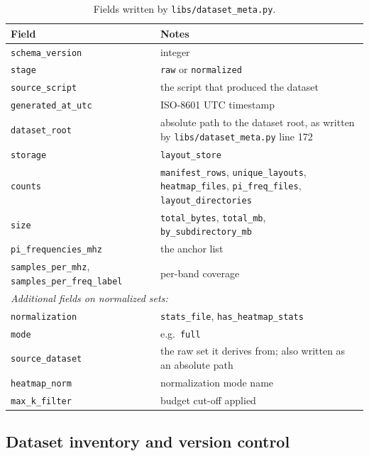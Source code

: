 \begin{table}[htbp]
\centering
\caption{Fields written by \texttt{libs/dataset\_meta.py}.}
\label{tab:appA_meta_fields}
\begin{tabular}{p{} p{}}
\hline
Field & Notes \\
\hline
\texttt{schema\_version} & integer \\
\texttt{stage} & \texttt{raw} or \texttt{normalized} \\
\texttt{source\_script} & the script that produced the dataset \\
\texttt{generated\_at\_utc} & ISO-8601 UTC timestamp \\
\texttt{dataset\_root} & absolute path to the dataset root, as written by
\texttt{libs/dataset\_meta.py} line 172 \\
\texttt{storage} & \texttt{layout\_store} \\
\texttt{counts} & \texttt{manifest\_rows}, \texttt{unique\_layouts}, \texttt{heatmap\_files},
\texttt{pi\_freq\_files}, \texttt{layout\_directories} \\
\texttt{size} & \texttt{total\_bytes}, \texttt{total\_mb}, \texttt{by\_subdirectory\_mb} \\
\texttt{pi\_frequencies\_mhz} & the anchor list \\
\texttt{samples\_per\_mhz}, \texttt{samples\_per\_freq\_label} & per-band coverage \\
\hline
\multicolumn{2}{l}{\emph{Additional fields on normalized sets:}} \\
\texttt{normalization} & \texttt{stats\_file}, \texttt{has\_heatmap\_stats} \\
\texttt{mode} & e.g.\ \texttt{full} \\
\texttt{source\_dataset} & the raw set it derives from; also written as an absolute path \\
\texttt{heatmap\_norm} & normalization mode name \\
\texttt{max\_k\_filter} & budget cut-off applied \\
\hline
\end{tabular}
\end{table}

\subsection{Dataset inventory and version control}
\label{subsec:appA_inventory}

